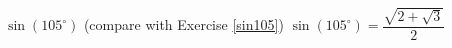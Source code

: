 {$\sin(105^{\circ})$  (compare with Exercise \ref{sin105})}
{$\sin(105^{\circ}) = \dfrac{\sqrt{2+\sqrt{3}}}{2}$ }
